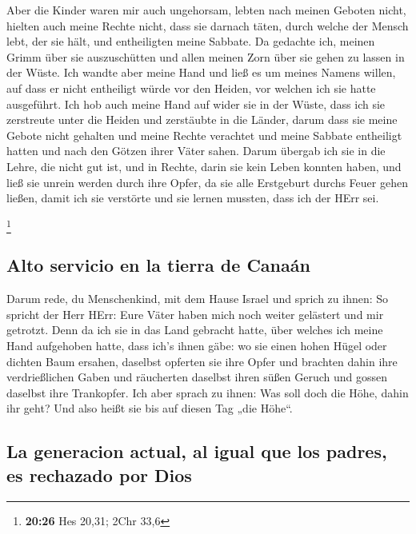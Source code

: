  Aber die Kinder waren mir auch ungehorsam, lebten nach
meinen Geboten nicht, hielten auch meine Rechte nicht, dass sie darnach
täten, durch welche der Mensch lebt, der sie hält, und entheiligten
meine Sabbate. Da gedachte ich, meinen Grimm über sie auszuschütten und
allen meinen Zorn über sie gehen zu lassen in der Wüste. 
Ich wandte aber meine Hand und ließ es um meines Namens willen, auf dass
er nicht entheiligt würde vor den Heiden, vor welchen ich sie hatte
ausgeführt.  Ich hob auch meine Hand auf wider sie in der
Wüste, dass ich sie zerstreute unter die Heiden und zerstäubte in die
Länder,  darum dass sie meine Gebote nicht gehalten und
meine Rechte verachtet und meine Sabbate entheiligt hatten und nach den
Götzen ihrer Väter sahen.  Darum übergab ich sie in die
Lehre, die nicht gut ist, und in Rechte, darin sie kein Leben konnten
haben,  und ließ sie unrein werden durch ihre Opfer, da
sie alle Erstgeburt durchs Feuer gehen ließen, damit ich sie verstörte
und sie lernen mussten, dass ich der HErr sei.

\footnote{\textbf{20:26} Hes 20,31; 2Chr 33,6}

\hypertarget{alto-servicio-en-la-tierra-de-canauxe1n}{%
\subsection{Alto servicio en la tierra de
Canaán}\label{alto-servicio-en-la-tierra-de-canauxe1n}}

 Darum rede, du Menschenkind, mit dem Hause Israel und
sprich zu ihnen: So spricht der Herr HErr: Eure Väter haben mich noch
weiter gelästert und mir getrotzt.  Denn da ich sie in
das Land gebracht hatte, über welches ich meine Hand aufgehoben hatte,
dass ich's ihnen gäbe: wo sie einen hohen Hügel oder dichten Baum
ersahen, daselbst opferten sie ihre Opfer und brachten dahin ihre
verdrießlichen Gaben und räucherten daselbst ihren süßen Geruch und
gossen daselbst ihre Trankopfer.  Ich aber sprach zu
ihnen: Was soll doch die Höhe, dahin ihr geht? Und also heißt sie bis
auf diesen Tag „die Höhe``.

\hypertarget{la-generacion-actual-al-igual-que-los-padres-es-rechazado-por-dios}{%
\subsection{La generacion actual, al igual que los padres, es rechazado
por
Dios}\label{la-generacion-actual-al-igual-que-los-padres-es-rechazado-por-dios}}


